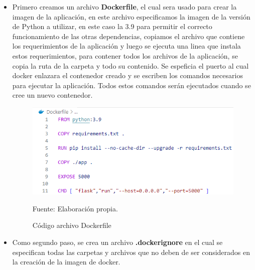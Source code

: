 \begin{itemize}
    \item Primero creamos un archivo \textbf{Dockerfile}, el cual sera usado para crear la imagen de la aplicación, en este archivo especificamos la imagen de la versión de Python a utilizar, en este caso la 3.9 para permitir el correcto funcionamiento de las otras dependencias, copiamos el archivo que contiene los requerimientos de la aplicación y luego se ejecuta una linea que instala estos requerimientos, para contener todos los archivos de la aplicación, se copia la ruta de la carpeta y todo su contenido. Se espeficia el puerto al cual docker enlazara el contenedor creado y se escriben los comandos necesarios para ejecutar la aplicación. Todos estos comandos serán ejecutados cuando se cree un nuevo contenedor.
    \begin{figure}[H]
        \begin{minipage}[t]{0.9\textwidth}
            \caption{Código archivo Dockerfile}
            \label{Docker_creation}        
        \end{minipage}
    
        \vspace{10pt}
    
        \begin{minipage}[b]{1\textwidth}
            \centering
            \includegraphics[width=\textwidth]{img/dockerfile.png}        
        \end{minipage}
    
        \begin{minipage}[t]{0.9\textwidth}
            Fuente: Elaboración propia.
        \end{minipage}
    \end{figure}

    \item Como segundo paso, se crea un archivo \textbf{.dockerignore} en el cual se especifican todas las carpetas y archivos que no deben de ser considerados en la creación de la imagen de docker.


\end{itemize}
